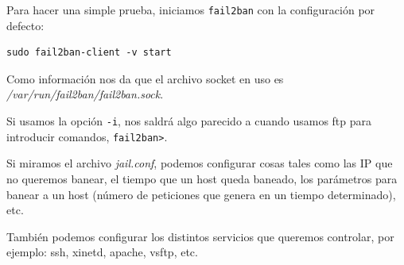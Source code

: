 \documentclass[10pt,a4paper,spanish]{article}
\numberwithin{equation}{section} %
\numberwithin{figure}{section} %
\numberwithin{table}{section} %
\begin{document}
Para hacer una simple prueba, iniciamos \texttt{fail2ban} con la configuración por defecto:
\begin{verbatim}
sudo fail2ban-client -v start
\end{verbatim}

Como información nos da que el archivo socket en uso es \textit{/var/run/fail2ban/fail2ban.sock}.

Si usamos la opción \texttt{-i}, nos saldrá algo parecido a cuando usamos ftp para introducir comandos, \texttt{fail2ban>}.

Si miramos el archivo \textit{jail.conf}, podemos configurar cosas tales como las IP que no queremos banear, el tiempo que un host queda baneado, los parámetros para banear a un host (número de peticiones que genera en un tiempo determinado), etc. 

También podemos configurar los distintos servicios que queremos controlar, por ejemplo: ssh, xinetd, apache, vsftp, etc.




\setcounter{subsection}{5}

\end{document}
